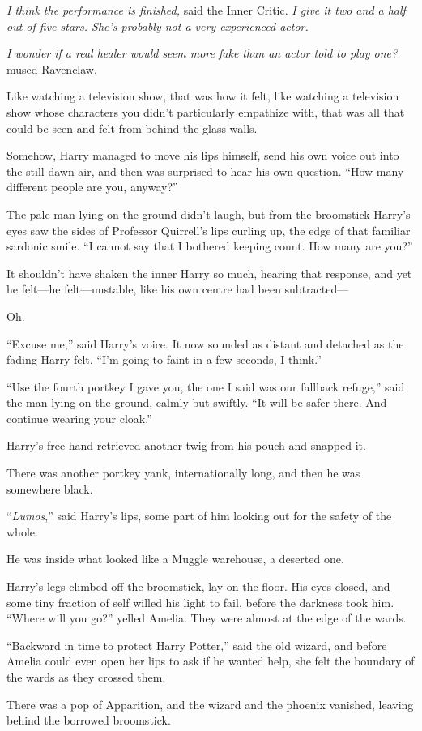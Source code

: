 \emph{I think the performance is finished,} said the Inner Critic. \emph{I give
it two and a half out of five stars. She’s probably not a very experienced
actor.}

\emph{I wonder if a real healer would seem more fake than an actor told to play
one?} mused Ravenclaw.

Like watching a television show, that was how it felt, like watching a
television show whose characters you didn’t particularly empathize with, that
was all that could be seen and felt from behind the glass walls.

Somehow, Harry managed to move his lips himself, send his own voice out into
the still dawn air, and then was surprised to hear his own question. “How many
different people are you, anyway?”

The pale man lying on the ground didn’t laugh, but from the broomstick Harry’s
eyes saw the sides of Professor Quirrell’s lips curling up, the edge of that
familiar sardonic smile. “I cannot say that I bothered keeping count. How many
are you?”

It shouldn’t have shaken the inner Harry so much, hearing that response, and
yet he felt—he felt—unstable, like his own centre had been subtracted—

Oh.

“Excuse me,” said Harry’s voice. It now sounded as distant and detached as the
fading Harry felt. “I’m going to faint in a few seconds, I think.”

“Use the fourth portkey I gave you, the one I said was our fallback refuge,”
said the man lying on the ground, calmly but swiftly. “It will be safer there.
And continue wearing your cloak.”

Harry’s free hand retrieved another twig from his pouch and snapped it.

There was another portkey yank, internationally long, and then he was somewhere
black.

“\emph{Lumos},” said Harry’s lips, some part of him looking out for the safety
of the whole.

He was inside what looked like a Muggle warehouse, a deserted one.

Harry’s legs climbed off the broomstick, lay on the floor. His eyes closed, and
some tiny fraction of self willed his light to fail, before the darkness took
him.
\later
“Where will you go?” yelled Amelia. They were almost at the edge of the wards.

“Backward in time to protect Harry Potter,” said the old wizard, and before
Amelia could even open her lips to ask if he wanted help, she felt the boundary
of the wards as they crossed them.

There was a pop of Apparition, and the wizard and the phoenix vanished, leaving
behind the borrowed broomstick.
